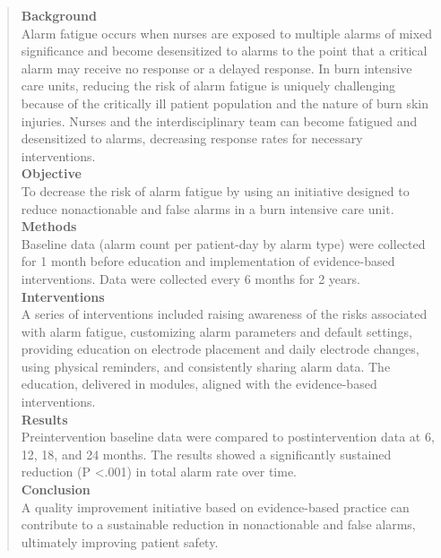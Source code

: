 \begin{quotation}
	
	\textbf{Background} \\
	
	Alarm fatigue occurs when nurses are exposed to multiple alarms of mixed significance and become desensitized to alarms to the point that a critical alarm may receive no response or a delayed response. In burn intensive care units, reducing the risk of alarm fatigue is uniquely challenging because of the critically ill patient population and the nature of burn skin injuries. Nurses and the interdisciplinary team can become fatigued and desensitized to alarms, decreasing response rates for necessary interventions. \\
	
	\textbf{Objective} \\
	
	To decrease the risk of alarm fatigue by using an initiative designed to reduce nonactionable and false alarms in a burn intensive care unit. \\
	
	\textbf{Methods} \\
	
	Baseline data (alarm count per patient-day by alarm type) were collected for 1 month before education and implementation of evidence-based interventions. Data were collected every 6 months for 2 years. \\
	
	\textbf{Interventions} \\
	
	A series of interventions included raising awareness of the risks associated with alarm fatigue, customizing alarm parameters and default settings, providing education on electrode placement and daily electrode changes, using physical reminders, and consistently sharing alarm data. The education, delivered in modules, aligned with the evidence-based interventions. \\
	
	\textbf{Results} \\
	
	Preintervention baseline data were compared to postintervention data at 6, 12, 18, and 24 months. The results showed a significantly sustained reduction (P \textless .001) in total alarm rate over time. \\
	
	\textbf{Conclusion} \\
	
	A quality improvement initiative based on evidence-based practice can contribute to a sustainable reduction in nonactionable and false alarms, ultimately improving patient safety.
	
\end{quotation}

